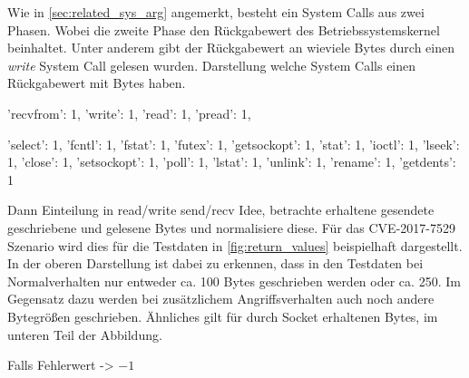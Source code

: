                 Wie in \autoref{sec:related_sys_arg} angemerkt, besteht ein System Calls aus zwei \glqq Phasen\grqq.
                Wobei die zweite Phase den Rückgabewert des Betriebssystemskernel beinhaltet.
                Unter anderem gibt der Rückgabewert an wieviele Bytes durch einen \textit{write} System Call gelesen wurden.
                Darstellung welche System Calls einen Rückgabewert mit Bytes haben.
                {
                    'recvfrom': 1,
                    'write': 1,
                    'read': 1,
                    'pread': 1,

                    'select': 1,
                    'fcntl': 1,
                    'fstat': 1,
                    'futex': 1,
                    'getsockopt': 1,
                    'stat': 1,
                    'ioctl': 1,
                    'lseek': 1,
                    'close': 1,
                    'setsockopt': 1,
                    'poll': 1,
                    'lstat': 1,
                    'unlink': 1,
                    'rename': 1,
                    'getdents': 1}
                Dann Einteilung in read/write send/recv
                Idee, betrachte erhaltene gesendete geschriebene und gelesene Bytes und normalisiere diese.
                Für das CVE-2017-7529 Szenario wird dies für die Testdaten in \autoref{fig:return_values} beispielhaft dargestellt.
                In der oberen Darstellung ist dabei zu erkennen, dass in den Testdaten bei Normalverhalten nur entweder ca. 100 Bytes geschrieben werden oder ca. 250.
                Im Gegensatz dazu werden bei zusätzlichem Angriffsverhalten auch noch andere Bytegrößen geschrieben.
                Ähnliches gilt für durch Socket erhaltenen Bytes, im unteren Teil der Abbildung.

                Falls Fehlerwert -> $-1$
                
